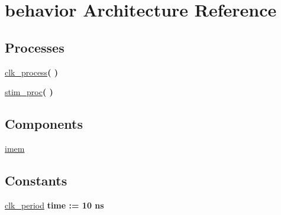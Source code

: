 \hypertarget{class_imem__tb_1_1behavior}{\section{behavior \-Architecture \-Reference}
\label{class_imem__tb_1_1behavior}
}
\*
\*
\subsection*{\-Processes}
 \begin{DoxyCompactItemize}
\item 
\hypertarget{class_imem__tb_1_1behavior_ac5bb218131b813f7908ec89476b31fca}{\hyperlink{class_imem__tb_1_1behavior_ac5bb218131b813f7908ec89476b31fca}{clk\-\_\-process}{\bfseries  (  )}}\label{class_imem__tb_1_1behavior_ac5bb218131b813f7908ec89476b31fca}

\item 
\hypertarget{class_imem__tb_1_1behavior_ad2efa6785cff833c341e27596b21aeb5}{\hyperlink{class_imem__tb_1_1behavior_ad2efa6785cff833c341e27596b21aeb5}{stim\-\_\-proc}{\bfseries  (  )}}\label{class_imem__tb_1_1behavior_ad2efa6785cff833c341e27596b21aeb5}

\end{DoxyCompactItemize}
\subsection*{\-Components}
 \begin{DoxyCompactItemize}
\item 
\hypertarget{class_imem__tb_1_1behavior_ac4e5786a088bdf818981004337212e04}{\hyperlink{class_imem__tb_1_1behavior_ac4e5786a088bdf818981004337212e04}{imem}  {\bfseries }  }\label{class_imem__tb_1_1behavior_ac4e5786a088bdf818981004337212e04}

\end{DoxyCompactItemize}
\subsection*{\-Constants}
 \begin{DoxyCompactItemize}
\item 
\hypertarget{class_imem__tb_1_1behavior_a6fb633437cba4c796dace5ed8efe52e1}{\hyperlink{class_imem__tb_1_1behavior_a6fb633437cba4c796dace5ed8efe52e1}{clk\-\_\-period} {\bfseries time  \-:=  10  ns } }\label{class_imem__tb_1_1behavior_a6fb633437cba4c796dace5ed8efe52e1}

\end{DoxyCompactItemize}
